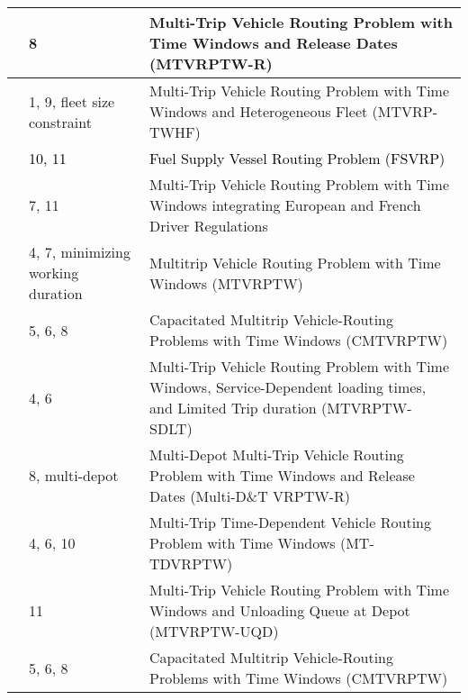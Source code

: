 \documentclass[11pt]{article}
\newcommand\addb[1]{\textcolor{black}{#1}}
\begin{document}
\begin{table}[]
\begin{threeparttable}
\begin{tabular}{@{}>{\raggedright}p{3cm}>{\raggedright}p{4cm}p{9cm}@{}}
         \midrule
             \cite{cattaruzza2016multi}
             & 8
             & Multi-Trip Vehicle Routing Problem with Time Windows and Release Dates (MTVRPTW-R) \\
         \midrule
             \cite{despaux2016multi}
             & 1, 9, fleet size constraint
             & Multi-Trip Vehicle Routing Problem with Time Windows and Heterogeneous Fleet (MTVRP- TWHF) \\
         \midrule
             \addb{\cite{christiansen2017operational}}
             & \addb{10, 11}
             & \addb{Fuel Supply Vessel Routing Problem (FSVRP)} \\
         \midrule
             \cite{benkebir2019multi}
             & 7, 11
             & Multi-Trip Vehicle Routing Problem with Time Windows integrating European and French Driver Regulations \\
         \midrule
             \cite{franccois2019adaptive}
             & 4, 7, minimizing working duration
             & Multitrip Vehicle Routing Problem with Time Windows (MTVRPTW) \\
         \midrule
             \cite{paradiso2020exact}
             & 5, 6, 8
             & Capacitated Multitrip Vehicle-Routing Problems with Time Windows (CMTVRPTW) \\
         \midrule
             \cite{neira2020new}
             & 4, 6
             & Multi-Trip Vehicle Routing Problem with Time Windows, Service-Dependent loading times, and Limited Trip duration (MTVRPTW- SDLT) \\
         \midrule
             \cite{zhen2020multi}
             & 8, multi-depot
             & Multi-Depot Multi-Trip Vehicle Routing Problem with Time Windows and Release Dates (Multi-D\&T VRPTW-R) \\
         \midrule
             \cite{pan2021multi}
             & 4, 6, 10
             & Multi-Trip Time-Dependent Vehicle Routing Problem with Time Windows (MT-TDVRPTW) \\
         \midrule
             \cite{huang2021multi}
             & 11
             & Multi-Trip Vehicle Routing Problem with Time Windows and Unloading Queue at Depot (MTVRPTW-UQD) \\
         \midrule
             \cite{yang2023exact}
             & 5, 6, 8
             & Capacitated Multitrip Vehicle-Routing Problems with Time Windows (CMTVRPTW) \\
         \bottomrule
    \end{tabular}
    \begin{tablenotes}

\end{tablenotes}
\end{threeparttable}
\end{table}
\end{document}
